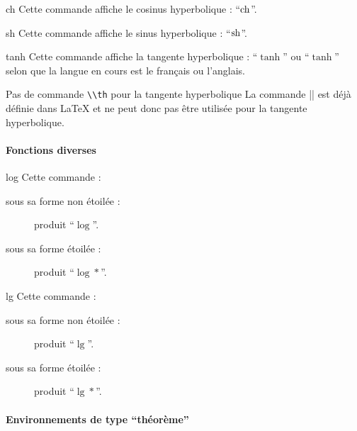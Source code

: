 \begin{docCommand}{ch}{}
  Cette commande affiche le cosinus hyperbolique : \enquote{$\operatorname{ch}$}.
\end{docCommand}

\begin{docCommand}{sh}{}
  Cette commande affiche le sinus hyperbolique : \enquote{$\operatorname{sh}$}.
\end{docCommand}

\begin{docCommand}{tanh}{}
  Cette commande affiche la tangente hyperbolique : \enquote{$\tanh$} ou
  \enquote{$\tanh$} selon que la
  langue en cours est le français ou l'anglais.
  \begin{dbremark}{Pas de commande \protect\lstinline+\\th+ pour la tangente
      hyperbolique}{}
    La commande |\th| est déjà définie dans \LaTeX{} et ne peut donc pas être
    utilisée pour la tangente hyperbolique.
  \end{dbremark}
\end{docCommand}

\paragraph{Fonctions diverses}

\begin{docCommand}{log}{}
  Cette commande :
  \begin{description}
  \item[sous sa forme non étoilée :] produit \enquote{$\log$}.
  \item[sous sa forme étoilée :] produit \enquote{$\log*$}.
  \end{description}
\end{docCommand}

\begin{docCommand}{lg}{}
  Cette commande :
  \begin{description}
  \item[sous sa forme non étoilée :] produit \enquote{$\lg$}.
  \item[sous sa forme étoilée :] produit \enquote{$\lg*$}.
  \end{description}
\end{docCommand}

\paragraph{Environnements de type \enquote{théorème}}

